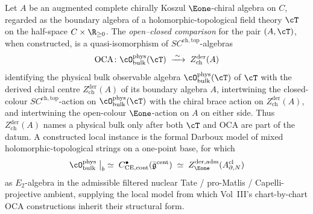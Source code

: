 \begin{definition}
\label{def:oca-quasi-iso}
Let $A$ be an augmented complete chirally Koszul $\Eone$-chiral algebra on $C$, regarded as the boundary algebra of a holomorphic-topological field theory $\cT$ on the half-space $C \times \R_{\geq 0}$. The \emph{open--closed comparison} for the pair $(A, \cT)$, when constructed, is a quasi-isomorphism of $SC^{\mathrm{ch}, \mathrm{top}}$-algebras
\[
 \mathrm{OCA} \colon
 \cO^{\mathrm{phys}}_{\mathrm{bulk}}(\cT)
 \;\xrightarrow{\;\sim\;}\;
 Z^{\mathrm{der}}_{\mathrm{ch}}(A)
\]
identifying the physical bulk observable algebra $\cO^{\mathrm{phys}}_{\mathrm{bulk}}(\cT)$ of $\cT$ with the derived chiral centre $Z^{\mathrm{der}}_{\mathrm{ch}}(A)$ of its boundary algebra $A$, intertwining the closed-colour $SC^{\mathrm{ch}, \mathrm{top}}$-action on $\cO^{\mathrm{phys}}_{\mathrm{bulk}}(\cT)$ with the chiral brace action on $Z^{\mathrm{der}}_{\mathrm{ch}}(A)$, and intertwining the open-colour $\Eone$-action on $A$ on either side. Thus $Z^{\mathrm{der}}_{\mathrm{ch}}(A)$ names a physical bulk only after both $\cT$ and $\mathrm{OCA}$ are part of the datum. A constructed local instance is the formal Darboux model of mixed holomorphic-topological strings on a one-point base, for which
\[
 \cO^{\mathrm{phys}}_{\mathrm{bulk}}\bigm|_b
 \;\simeq\;
 C^\bullet_{\mathrm{CE}, \mathrm{cont}}(\bar{\mathfrak{g}}^{\mathrm{cent}})
 \;\simeq\;
 Z^{\mathrm{der}, \mathrm{adm}}_{\Eone}(A^{\mathrm{cl}}_{\partial, N})
\]
as $E_2$-algebra in the admissible filtered nuclear Tate / pro-Matlis / Capelli-projective ambient, supplying the local model from which Vol~III's chart-by-chart $\mathrm{OCA}$ constructions inherit their structural form.
\end{definition}

